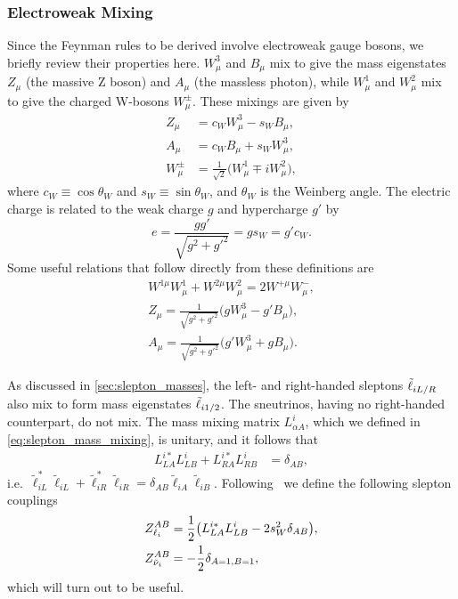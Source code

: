 \subsubsection{Electroweak Mixing}
Since the Feynman rules to be derived involve electroweak gauge bosons, we briefly review their properties here.
$W^3_\mu$ and $B_\mu$ mix to give the mass eigenstates $Z_\mu$ (the massive Z boson) and $A_\mu$ (the massless photon), while $W^1_\mu$ and $W^2_\mu$ mix to give the charged W-bosons $W^\pm_\mu$. These mixings are given by
\begin{subequations}
    \begin{align}
        Z_\mu &= c_W W^3_\mu - s_W B_\mu, \label{eq:ew_Z}
        \\
        A_\mu &= c_W B_\mu + s_W W^3_\mu, \label{eq:ew_A}
        \\
        W^\pm_\mu &= \frac{1}{\sqrt{2}} \bigl( W^1_\mu \mp iW^2_\mu \bigr) \label{eq:ew_W},
    \end{align}
\end{subequations}
where $c_W \equiv \cos\theta_W$ and $s_W \equiv \sin\theta_W$, and $\theta_W$ is the Weinberg angle.
The electric charge is related to the weak charge $g$ and hypercharge $g'$ by
\begin{equation}
    e = \frac{gg'}{\sqrt{g^2+g'^2}} = gs_W = g'c_W.
\end{equation}
Some useful relations that follow directly from these definitions are
\begin{subequations}
    \begin{gather}
        W^{1\mu}W^1_\mu + W^{2\mu}W^2_\mu = 2W^{+\mu}W^-_\mu, \label{eq:W12_squared}
        \\
        Z_\mu = \frac{1}{\sqrt{g^2+g'^2}} \bigl( gW^3_\mu - g'B_\mu \bigr),
        \\
        A_\mu = \frac{1}{\sqrt{g^2+g'^2}} \bigl( g'W^3_\mu + gB_\mu \bigr).
    \end{gather}
\end{subequations}

As discussed in \cref{sec:slepton_masses}, the left- and right-handed sleptons ${\tilde{\ell}}_{iL/R}$ also mix to form mass eigenstates ${\tilde{\ell}}_{i1/2}$.
The sneutrinos, having no right-handed counterpart, do not mix.
The mass mixing matrix $L^i_{\alpha A}$, which we defined in \cref{eq:slepton_mass_mixing}, is unitary, and it follows that
\begin{align*}
    L^{i*}_{LA}L^i_{LB} + L^{i*}_{RA}L^i_{RB}
    &= \delta_{AB},
\end{align*}
i.e.\ $\tilde\ell_{iL}^*\tilde\ell_{iL}+\tilde\ell_{iR}^*\tilde\ell_{iR} = \delta_{AB}\tilde\ell_{iA}\tilde\ell_{iB}$.
Following~\cite{Richardson:2000nt} we define the following slepton couplings
\begin{subequations}
\begin{align}
    Z_{\ell_i}^{AB} &= \frac{1}{2}\bigl( L^{i*}_{LA}L^i_{LB} - 2s_W^2 \delta_{AB} \bigr),
    \label{eq:zliab}
    \\
    Z_{\tilde\nu_i}^{AB} &= -\frac{1}{2}\delta_{A=1,B=1},
    \label{eq:znuiab}
\end{align}
\end{subequations}
which will turn out to be useful.


